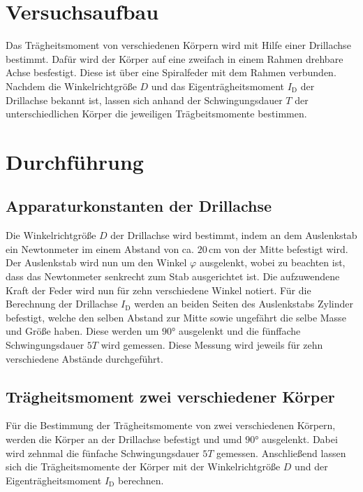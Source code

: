 
\section{Versuchsaufbau}
\label{sec:Versuchsaufbau}
Das Trägheitsmoment von verschiedenen Körpern wird mit Hilfe einer
Drillachse bestimmt. Dafür wird der Körper auf eine zweifach in einem Rahmen 
drehbare Achse besfestigt. Diese ist über eine Spiralfeder mit dem Rahmen 
verbunden. Nachdem die Winkelrichtgröße $D$ und das Eigenträgheitsmoment $I_{\text{D}}$
der Drillachse bekannt ist, lassen sich anhand der Schwingungsdauer $T$ der 
unterschiedlichen Körper die jeweiligen Trägbeitsmomente bestimmen.
%
\section{Durchführung}
\label{sec:Durchführung}
\subsection{Apparaturkonstanten der Drillachse}
\label{sec:Apparturkonstanten}
Die Winkelrichtgröße $D$ der Drillachse wird bestimmt, indem an dem Auslenkstab
ein Newtonmeter im einem Abstand von ca. $20\, \unit{\centi\meter}$ von der Mitte 
befestigt wird. Der Auslenkstab wird nun um den Winkel $\varphi$ ausgelenkt, wobei zu beachten ist,
dass das Newtonmeter senkrecht zum Stab ausgerichtet ist. Die aufzuwendene Kraft der Feder wird nun
für zehn verschiedene Winkel notiert. Für die Berechnung der Drillachse $I_{\text{D}}$ werden an beiden Seiten des 
Auslenkstabs Zylinder befestigt, welche den selben Abstand zur Mitte sowie ungefährt die selbe Masse und Größe
haben. Diese werden um $90°$ ausgelenkt und die fünffache Schwingungsdauer $5T$ wird gemessen. Diese Messung
wird jeweils für zehn verschiedene Abstände durchgeführt.
%
\subsection{Trägheitsmoment zwei verschiedener Körper}
\label{sec:TragheitZweiKörper}
Für die Bestimmung der Trägheitsmomente von zwei verschiedenen Körpern, werden die Körper an der Drillachse
befestigt und umd $90°$ ausgelenkt. Dabei wird zehnmal die fünfache Schwingungsdauer $5T$ gemessen. Anschließend
lassen sich die Trägheitsmomente der Körper mit der Winkelrichtgröße $D$ und der Eigenträgheitsmoment $I_{\text{D}}$ berechnen.
